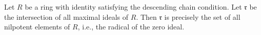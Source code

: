 Let $R$ be a ring with identity satisfying the descending chain condition. Let $\mathfrak{r}$ be the intersection of all maximal ideals of $R$. Then $\mathfrak{r}$ is precisely the set of all nilpotent elements of $R$, i.e., the radical of the zero ideal.
